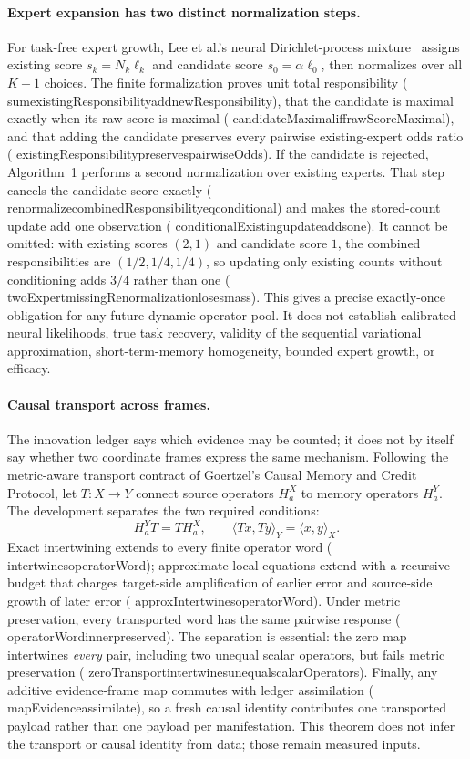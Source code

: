 \documentclass[11pt]{article}
\newcommand{\leanname}[1]{{\scriptsize\ttfamily
  \def\_{\textunderscore\allowbreak}#1}}
\begin{document}
\paragraph{Expert expansion has two distinct normalization steps.}
For task-free expert growth, Lee et al.'s neural Dirichlet-process
mixture~\cite{lee2020cndpm} assigns existing score
$s_k=N_k\ell_k$ and candidate score $s_0=\alpha\ell_0$, then normalizes
over all $K+1$ choices. The finite formalization proves unit total
responsibility
(\leanname{sum\_existingResponsibility\_add\_newResponsibility}), that the
candidate is maximal exactly when its raw score is maximal
(\leanname{candidateMaximal\_iff\_rawScoreMaximal}), and that adding the
candidate preserves every pairwise existing-expert odds ratio
(\leanname{existingResponsibility\_preserves\_pairwiseOdds}).
If the candidate is rejected, Algorithm~1 performs a second normalization
over existing experts. That step cancels the candidate score exactly
(\leanname{renormalize\_combinedResponsibility\_eq\_conditional}) and makes
the stored-count update add one observation
(\leanname{conditionalExisting\_update\_adds\_one}). It cannot be omitted:
with existing scores $(2,1)$ and candidate score $1$, the combined
responsibilities are $(1/2,1/4,1/4)$, so updating only existing counts
without conditioning adds $3/4$ rather than one
(\leanname{twoExpert\_missingRenormalization\_loses\_mass}).
This gives a precise exactly-once obligation for any future dynamic
operator pool. It does not establish calibrated neural likelihoods, true
task recovery, validity of the sequential variational approximation,
short-term-memory homogeneity, bounded expert growth, or efficacy.

\paragraph{Causal transport across frames.}
The innovation ledger says which evidence may be counted; it does not by itself say
whether two coordinate frames express the same mechanism. Following the metric-aware
transport contract of Goertzel's Causal Memory and Credit Protocol, let
$T:X\to Y$ connect source operators $H^X_a$ to memory operators $H^Y_a$.
The development separates the two required conditions:
\[
 H^Y_aT=TH^X_a,\qquad
 \langle Tx,Ty\rangle_Y=\langle x,y\rangle_X.
\]
Exact intertwining extends to every finite operator word
(\leanname{intertwines\_operatorWord}); approximate local equations extend with a
recursive budget that charges target-side amplification of earlier error and
source-side growth of later error
(\leanname{approxIntertwines\_operatorWord}). Under metric preservation, every
transported word has the same pairwise response
(\leanname{operatorWord\_inner\_preserved}). The separation is essential: the zero
map intertwines \emph{every} pair, including two unequal scalar operators, but fails
metric preservation
(\leanname{zeroTransport\_intertwines\_unequal\_scalarOperators}).
Finally, any additive evidence-frame map commutes with ledger assimilation
(\leanname{mapEvidence\_assimilate}), so a fresh causal identity contributes one
transported payload rather than one payload per manifestation. This theorem does not
infer the transport or causal identity from data; those remain measured inputs.
\end{document}
